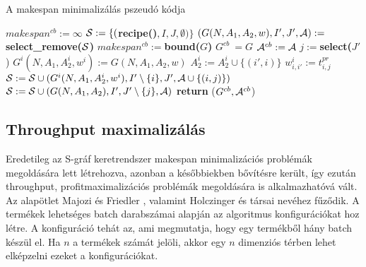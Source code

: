 \begin{algorithm}[H]
\caption{A makespan minimalizálás pszeudó kódja}
\label{makespan_min}
\begin{algorithmic}[1]
  \State $makespan^{cb}:= \infty$
  \State ${\cal S}:= \{($\textbf{recipe()}$,I,J,\emptyset)\}$  
    \State $(G(N,A_1,A_2,w),I',J',{\cal A}):= $\textbf{select\_remove(}$\cal S$\textbf{)}
        \State $makespan^{cb}:= $\textbf{bound(}$G$\textbf{)}
        \State $G^{cb}\:= G$
        \State ${\cal A}^{cb}:= {\cal A}$        
      \Else
        \State $j:= $\textbf{select(}$J'${)} 
          \State $G^i(N,A_1,A^i_2,w^i):= G(N,A_1,A_2,w)$
            \State $A^i_2:= A^i_2 \cup \{(i',i)\}$
          \EndFor        
            \State $w^i_{i,i'}:= t^{pr}_{i,j}$
          \EndFor
          \State ${\cal S}:= {\cal S} \cup (G^i(N,A_1,A^i_2,w^i),I'\setminus\{i\},J',{\cal A}\cup\{(i,j)\})$
        \EndFor
          \State ${\cal S}:= {\cal S} \cup (G(N,A_1,A_2),I',J'\setminus\{j\},{\cal A})$
        \EndIf
      \EndIf %
    \EndIf %
  \EndWhile %
    \State \textbf{return} ($G^{cb},{\cal A}^{cb}$)
  \EndIf
\end{algorithmic}
\end{algorithm}

\newpage
\subsection{Throughput maximalizálás}
Eredetileg az S-gráf keretrendszer makespan minimalizációs problémák megoldására lett létrehozva, azonban a későbbiekben bővítésre került, így ezután throughput, profitmaximalizációs problémák megoldására is alkalmazhatóvá vált.
Az alapötlet Majozi és Friedler \cite{majozifriedler}, valamint Holczinger és társai \cite{holczinger} nevéhez fűződik.
A termékek lehetséges batch darabszámai alapján az algoritmus konfigurációkat hoz létre.
A konfiguráció tehát az, ami megmutatja, hogy egy termékből hány batch készül el.
Ha $n$ a termékek számát jelöli, akkor egy $n$ dimenziós térben lehet elképzelni ezeket a konfigurációkat. 

